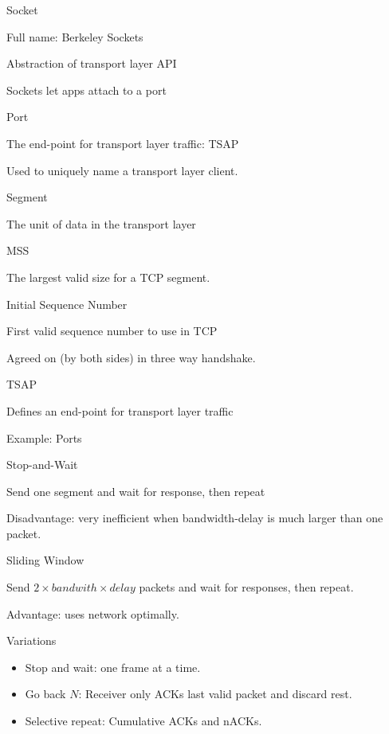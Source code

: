 \documentclass[main.tex]{subfiles}
\begin{document}
\begin{card}{Socket}
\item Full name: Berkeley Sockets
\item Abstraction of transport layer API
\item Sockets let apps attach to a port
\end{card}

\begin{card}{Port}
\item The end-point for transport layer traffic: TSAP
\item Used to uniquely name a transport layer client.
\end{card}

\begin{card}{Segment}
\item The unit of data in the transport layer
\end{card}

\begin{card}{MSS}
\item The largest valid size for a TCP segment.
\end{card}

\begin{card}[ISN]{Initial Sequence Number}
\item First valid sequence number to use in TCP
\item Agreed on (by both sides) in three way handshake.
\end{card}

\begin{card}{TSAP}
\item Defines an end-point for transport layer traffic
\item Example: Ports
\end{card}

\begin{card}{Stop-and-Wait}
\item Send one segment and wait for response, then repeat
\item Disadvantage: very inefficient when bandwidth-delay is much larger than one packet.
\end{card}

\begin{card}{Sliding Window}
\item Send $2\times bandwith \times delay$ packets and wait for responses, then repeat.
\item Advantage: uses network optimally.
\item Variations
    \begin{itemize}
        \item Stop and wait: one frame at a time.
        \item Go back $N$: Receiver only ACKs last valid packet and discard rest.
        \item Selective repeat: Cumulative ACKs and nACKs.
    \end{itemize}
\end{card}
\end{document}
